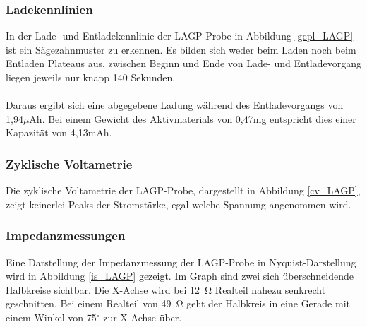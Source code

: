 \documentclass[a4paper, 11pt, headsepline,footsepline,twoside,abstract]{scrbook}
\begin{document}
\subsubsection{Ladekennlinien}
In der Lade- und Entladekennlinie der LAGP-Probe in Abbildung \ref{gcpl_LAGP} ist ein Sägezahnmuster zu erkennen. Es bilden sich weder beim Laden noch beim Entladen Plateaus aus. zwischen Beginn und Ende von Lade- und Entladevorgang liegen jeweils nur knapp 140 Sekunden.
\\\\
Daraus ergibt sich eine abgegebene Ladung während des Entladevorgangs von 1,94$\mu$Ah. Bei einem Gewicht des Aktivmaterials von 0,47mg entspricht dies einer Kapazität von 4,13mAh.
\subsubsection{Zyklische Voltametrie}
Die zyklische Voltametrie der LAGP-Probe, dargestellt in Abbildung \ref{cv_LAGP}, zeigt keinerlei Peaks der Stromstärke, egal welche Spannung angenommen wird.
\subsubsection{Impedanzmessungen}
Eine Darstellung der Impedanzmessung der LAGP-Probe in Nyquist-Darstellung wird in Abbildung \ref{is_LAGP} gezeigt. Im Graph sind zwei sich überschneidende Halbkreise sichtbar. Die X-Achse wird bei \SI{12}{\ohm} Realteil nahezu senkrecht geschnitten. Bei einem Realteil von \SI{49}{\ohm} geht der Halbkreis in eine Gerade mit einem Winkel von 75$^\circ$ zur X-Achse über.
\newpage
\end{document}
